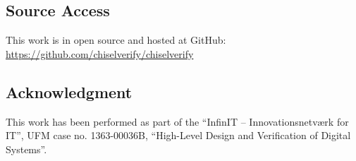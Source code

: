 \documentclass[conference]{IEEEtran}
\begin{document}
\subsection*{Source Access}

This work is in open source and hosted at GitHub: \url{https://github.com/chiselverify/chiselverify}

\subsection*{Acknowledgment}

This work has been performed as part of the
``InfinIT -- Innovationsnetv{\ae}rk for IT'', UFM case no. 1363-00036B,
``High-Level Design and Verification of Digital Systems''.



\end{document}
